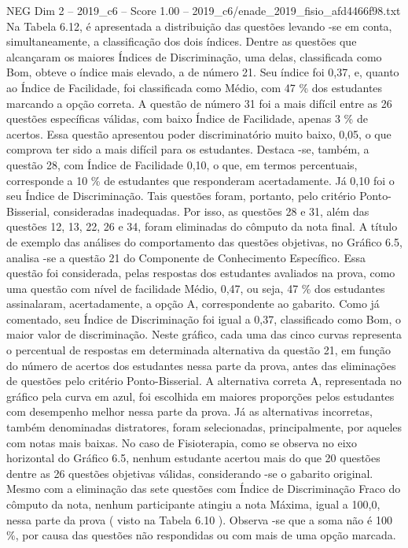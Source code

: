\begin{textsample}{NEG Dim 2 – 2019\_c6 – Score 1.00 – 2019\_c6/enade\_2019\_fisio\_afd4466f98.txt}
Na Tabela 6.12, é apresentada a distribuição das questões levando -se em conta, simultaneamente, a classificação dos dois índices.
Dentre as questões que alcançaram os maiores Índices de Discriminação, uma delas, classificada como Bom, obteve o índice mais elevado, a de número 21.
Seu índice foi 0,37, e, quanto ao Índice de Facilidade, foi classificada como Médio, com 47 \% dos estudantes marcando a opção correta.
A questão de número 31 foi a mais difícil entre as 26 questões específicas válidas, com baixo Índice de Facilidade, apenas 3 \% de acertos.
Essa questão apresentou poder discriminatório muito baixo, 0,05, o que comprova ter sido a mais difícil para os estudantes.
Destaca -se, também, a questão 28, com Índice de Facilidade 0,10, o que, em termos percentuais, corresponde a 10 \% de estudantes que responderam acertadamente.
Já 0,10 foi o seu Índice de Discriminação.
Tais questões foram, portanto, pelo critério Ponto-Bisserial, consideradas inadequadas.
Por isso, as questões 28 e 31, além das questões 12, 13, 22, 26 e 34, foram eliminadas do cômputo da nota final.
A título de exemplo das análises do comportamento das questões objetivas, no Gráfico 6.5, analisa -se a questão 21 do Componente de Conhecimento Específico.
Essa questão foi considerada, pelas respostas dos estudantes avaliados na prova, como uma questão com nível de facilidade Médio, 0,47, ou seja, 47 \% dos estudantes assinalaram, acertadamente, a opção A, correspondente ao gabarito.
Como já comentado, seu Índice de Discriminação foi igual a 0,37, classificado como Bom, o maior valor de discriminação.
Neste gráfico, cada uma das cinco curvas representa o percentual de respostas em determinada alternativa da questão 21, em função do número de acertos dos estudantes nessa parte da prova, antes das eliminações de questões pelo critério Ponto-Bisserial.
A alternativa correta A, representada no gráfico pela curva em azul, foi escolhida em maiores proporções pelos estudantes com desempenho melhor nessa parte da prova.
Já as alternativas incorretas, também denominadas distratores, foram selecionadas, principalmente, por aqueles com notas mais baixas.
No caso de Fisioterapia, como se observa no eixo horizontal do Gráfico 6.5, nenhum estudante acertou mais do que 20 questões dentre as 26 questões objetivas válidas, considerando -se o gabarito original.
Mesmo com a eliminação das sete questões com Índice de Discriminação Fraco do cômputo da nota, nenhum participante atingiu a nota Máxima, igual a 100,0, nessa parte da prova ( visto na Tabela 6.10 ).
Observa -se que a soma não é 100 \%, por causa das questões não respondidas ou com mais de uma opção marcada.

\end{textsample}
